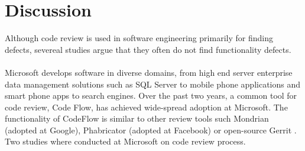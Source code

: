 \documentclass[ifip]{svmult}
\begin{document}
\section{Discussion}
\label{sec:2}



Although code review is used in software engineering primarily for finding defects, severeal studies argue that they often 
do not find functionality defects.
\\ \\
Microsoft develops software in diverse domains, from high end server enterprise data management solutions such
as SQL Server to mobile phone applications and smart phone apps to search engines. Over the past two years, 
a common tool for code review, Code Flow, has achieved wide-spread adoption at Microsoft. 
The functionality of CodeFlow is similar to other review tools such Mondrian \cite{contribution6} (adopted at Google), Phabricator 
\cite{contribution7} (adopted at Facebook) or open-source Gerrit \cite{contribution8}.
Two studies where conducted at Microsoft on code review process.
\end{document}
